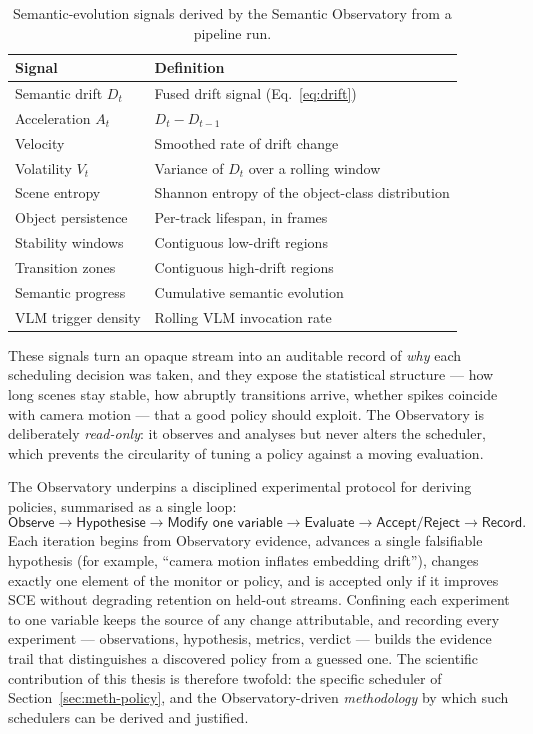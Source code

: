 \begin{table}[htbp]
\centering
\caption[Semantic Observatory signals]{Semantic-evolution signals derived by
the Semantic Observatory from a pipeline run.}
\label{tab:observatory-signals}
\small
\begin{tabular}{@{}ll@{}}
\toprule
\textbf{Signal} & \textbf{Definition} \\
\midrule
Semantic drift $D_t$        & Fused drift signal (Eq.~\ref{eq:drift}) \\
Acceleration $A_t$          & $D_t - D_{t-1}$ \\
Velocity                    & Smoothed rate of drift change \\
Volatility $V_t$            & Variance of $D_t$ over a rolling window \\
Scene entropy               & Shannon entropy of the object-class distribution \\
Object persistence          & Per-track lifespan, in frames \\
Stability windows           & Contiguous low-drift regions \\
Transition zones            & Contiguous high-drift regions \\
Semantic progress           & Cumulative semantic evolution \\
VLM trigger density         & Rolling VLM invocation rate \\
\bottomrule
\end{tabular}
\end{table}

These signals turn an opaque stream into an auditable record of \emph{why}
each scheduling decision was taken, and they expose the statistical structure
--- how long scenes stay stable, how abruptly transitions arrive, whether
spikes coincide with camera motion --- that a good policy should exploit. The
Observatory is deliberately \emph{read-only}: it observes and analyses but
never alters the scheduler, which prevents the circularity of tuning a policy
against a moving evaluation.

The Observatory underpins a disciplined experimental protocol for deriving
policies, summarised as a single loop:
\begin{equation}
  \textsf{Observe} \rightarrow \textsf{Hypothesise} \rightarrow
  \textsf{Modify one variable} \rightarrow \textsf{Evaluate} \rightarrow
  \textsf{Accept/Reject} \rightarrow \textsf{Record}.
  \label{eq:protocol}
\end{equation}
Each iteration begins from Observatory evidence, advances a single falsifiable
hypothesis (for example, ``camera motion inflates embedding drift''), changes
exactly one element of the monitor or policy, and is accepted only if it
improves SCE without degrading retention on held-out streams. Confining each
experiment to one variable keeps the source of any change attributable, and
recording every experiment --- observations, hypothesis, metrics, verdict ---
builds the evidence trail that distinguishes a discovered policy from a guessed
one. The scientific contribution of this thesis is therefore twofold: the
specific scheduler of Section~\ref{sec:meth-policy}, and the Observatory-driven
\emph{methodology} by which such schedulers can be derived and justified.
